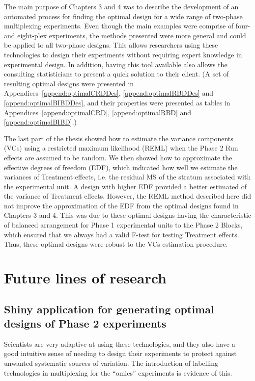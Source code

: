 The main purpose of Chapters 3 and 4 was to describe the development of an automated process for finding the optimal design for a wide range of two-phase multiplexing experiments. Even though the main examples were comprise of four- and eight-plex experiments, the methods presented were more general and could be applied to all two-phase designs. This allows researchers using these technologies to design their experiments without requiring expert knowledge in experimental design. In addition, having this tool available also allows the consulting statisticians to present a quick solution to their client. (A set of resulting optimal designs were presented in Appendices~\ref{append:optimalCRDDes}, \ref{append:optimalRBDDes} and \ref{append:optimalBIBDDes}, and their properties were presented as tables in Appendices~\ref{append:optimalCRD}, \ref{append:optimalRBD} and \ref{append:optimalBIBD}.) 

The last part of the thesis showed how to estimate the variance components (VCs) using a restricted maximum likelihood (REML) when the Phase 2 Run effects are assumed to be random. We then showed how to approximate the effective degrees of freedom (EDF), which indicated how well we estimate the variances of Treatment effects, i.e. the residual MS of the stratum associated with the experimental unit. A design with higher EDF provided a better estimated of the variance of Treatment effects. However, the REML method described here did not improve the approximation of the EDF from the optimal designs found in Chapters 3 and 4. This was due to these optimal designs having the characteristic of balanced arrangement for Phase 1 experimental units to the Phase 2 Blocks, which ensured that we always had a valid F-test for testing Treatment effects. Thus, these optimal designs were robust to the VCs estimation procedure. 
 
\section{Future lines of research}
\subsection{Shiny application for generating optimal designs of Phase 2 experiments}
Scientists are very adaptive at using these technologies, and they also have a good intuitive sense of needing to design their experiments to protect against unwanted systematic sources of variation. The introduction of labelling technologies in multiplexing for the ``omics'' experiments is evidence of this.

